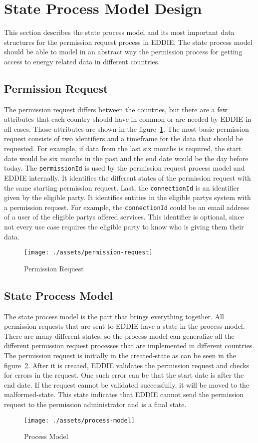 \section{State Process Model Design}\label{sec:state-process-model-design}
This section describes the state process model and its most important data structures for the permission request process in EDDIE\@.
The state process model should be able to model in an abstract way the permission process for getting access to energy related data in different countries.

\subsection{Permission Request}\label{subsec:permission-request}
The permission request differs between the countries, but there are a few attributes that each country should have in common or are needed by EDDIE in all cases.
Those attributes are shown in the figure\ \ref{fig:permission-request}.
The most basic permission request consists of two identifiers and a timeframe for the data that should be requested.
For example, if data from the last six months is required, the start date would be six months in the past and the end date would be the day before today.
The \texttt{permissionId} is used by the permission request process model and EDDIE internally.
It identifies the different states of the permission request with the same starting permission request.
Last, the \texttt{connectionId} is an identifier given by the eligible party.
It identifies entities in the eligible partys system with a permission request.
For example, the \texttt{connectionId} could be an email address of a user of the eligible partys offered services.
This identifier is optional, since not every use case requires the eligible party to know who is giving them their data.


\begin{figure}[h]
    \texttt{[image: ./assets/permission-request]}
    \caption{Permission Request}
    \label{fig:permission-request}
\end{figure}

\subsection{State Process Model}\label{subsec:state-process-model}
The state process model is the part that brings everything together.
All permission requests that are sent to EDDIE have a state in the process model.
There are many different states, so the process model can generalize all the different permission request processes that are implemented in different countries.
The permission request is initially in the created-state as can be seen in the figure\ \ref{fig:process-model}.
After it is created, EDDIE validates the permission request and checks for errors in the request.
One such error can be that the start date is after the end date.
If the request cannot be validated successfully, it will be moved to the malformed-state.
This state indicates that EDDIE cannot send the permission request to the permission administrator and is a final state.


\begin{figure}[h]
    \texttt{[image: ./assets/process-model]}
    \caption{Process Model}
    \label{fig:process-model}
\end{figure}